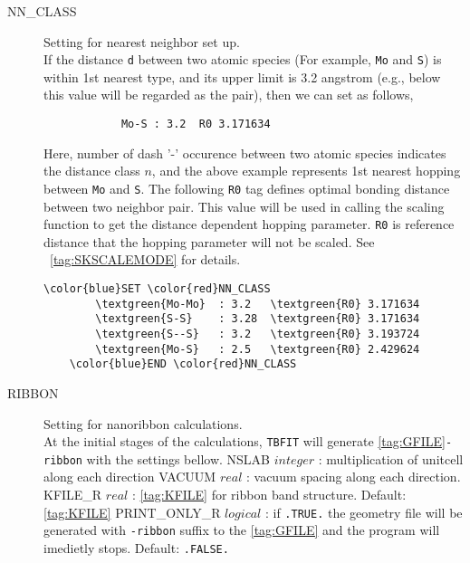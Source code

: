 \documentclass[a4paper,12pt]{scrartcl}
\makeatletter
\def\namedlabel#1#2{\begingroup
    #2%
    \def\@currentlabel{#2}%
    \phantomsection\label{#1}\endgroup
}
\newcommand{\tbfitname}{\textcolor{blue!85!white}{\texttt{TBFIT}}}
\newcommand{\textgreen}[1]{\textcolor{green!50!black}{\texttt{#1}}}
\makeatother
\begin{document}
\begin{description}
 	\item[\namedlabel{tag:NNCLASS}{NN\_CLASS}] 
		Setting for nearest neighbor set up. \\
		If the distance \texttt{d} between two atomic species (For example, \texttt{Mo} 
		and \texttt{S}) is within 1st nearest type, and its upper limit is 3.2 
		angstrom (e.g., below this value will be regarded as the pair), then
		we can set as follows,
        \begin{verbatim}
         	Mo-S : 3.2  R0 3.171634
        \end{verbatim}  

		Here, number of dash '-' occurence between two atomic species indicates 
		the distance class $n$, and the above example represents 1st nearest 
		hopping between \texttt{Mo} and \texttt{S}. The following \texttt{R0} 
		tag defines optimal bonding distance between two neighbor pair. 
		This value will be used in calling the scaling function to get 
		the distance dependent hopping parameter. \texttt{R0} is reference distance that the hopping parameter will not be scaled. See ~\ref{tag:SKSCALEMODE} for details.

 \begin{Verbatim}[commandchars=\\\{\},gobble=4, frame=single, framesep=2mm, 
    label= NN\_CLASS setup example,
    labelposition=bottomline]
    \color{blue}SET \color{red}NN_CLASS
        \textgreen{Mo-Mo}  : 3.2   \textgreen{R0} 3.171634
        \textgreen{S-S}    : 3.28  \textgreen{R0} 3.171634  
        \textgreen{S--S}   : 3.2   \textgreen{R0} 3.193724  
        \textgreen{Mo-S}   : 2.5   \textgreen{R0} 2.429624  
    \color{blue}END \color{red}NN_CLASS
 \end{Verbatim}


 	\item[\namedlabel{tag:RIBBON}{RIBBON}] 
		Setting for nanoribbon calculations. \\
		At the initial stages of the calculations, \tbfitname{} will generate
		\ref{tag:GFILE}\texttt{-ribbon} with the settings bellow.
		\subitem NSLAB $integer$ : multiplication of unitcell along each direction 
		\subitem VACUUM  $real$  : vacuum spacing along each direction.  
		\subitem KFILE\_R $real$  : \ref{tag:KFILE} for ribbon band structure. 
			Default: \ref{tag:KFILE}
		\subitem PRINT\_ONLY\_R $logical$  : if \texttt{.TRUE.} the geometry 
		file will be generated with \texttt{-ribbon} suffix to the \ref{tag:GFILE}
		and the program will imedietly stops. Default: \texttt{.FALSE.}
		

\end{description}
\end{document}
